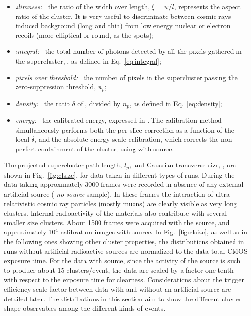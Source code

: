 \begin{itemize}
  \item \textit{slimness:~} the ratio of the width over length,
    $\xi=w/l$, represents the aspect ratio of the cluster. It is very
    useful to discriminate between cosmic rays-induced background
    (long and thin) from low energy nuclear or electron recoils (more
    elliptical or round, as the \fe spots);
    
  \item \textit{integral:~} the total number of photons detected by all the
  pixels gathered in the supercluster, \isclu, as defined in
  Eq.~\ref{eq:integral};

  \item \textit{pixels over threshold:~} the number of pixels in the
  supercluster passing the zero-suppression threshold, $n_p$;

  \item \textit{density:~} the ratio $\delta$ of \isclu, divided by
  $n_p$, as defined in Eq.~\ref{eq:density};

  \item \textit{energy:~} the calibrated energy, expressed
    in \keV. The calibration method simultaneously performs both the
    per-slice correction as a function of the local $\delta$, and the
    absolute energy scale calibration, which corrects the non perfect
    containment of the cluster, using with \fe source.
\end{itemize}

The projected supercluster path length, $l_p$, and Gaussian transverse
size, \tsigmag, are shown in Fig.~\ref{fig:clsize}, for data taken in
different types of runs.  During the data-taking approximately 3000
frames were recorded in absence of any external artificial source ({\it
no-source} sample). In these frames the interaction of
ultra-relativistic cosmic ray particles (mostly muons) are clearly
visible as very long clusters. Internal radioactivity of the \lemon
materials also contribute with several smaller size clusters. About
1500 frames were acquired with the \ambe source, and approximately
$10^4$ calibration images with \fe source. In  Fig.~\ref{fig:clsize}, as well as
in the following ones showing other cluster properties, the
distributions obtained in runs  without artificial radioactive sources are normalized
to the \ambe data total CMOS exposure time. For the data with \fe source,
since the activity of the source is such to produce about 15
clusters/event, the data are scaled by a factor one-tenth with respect to the \ambe
exposure time for clearness. Considerations about the trigger
efficiency scale factor between data with and without an artificial  source are
detailed later. The distributions in this section aim to show
the different cluster shape observables  among the  different kinds of
events.

